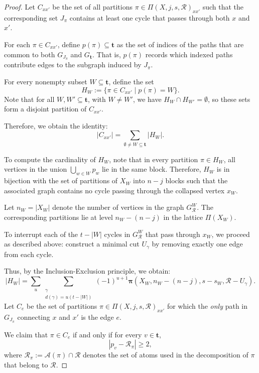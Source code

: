\documentclass[12pt]{extarticle}
\begin{document}
\begin{proof}
		Let \( C_{xx'} \) be the set of all partitions \( \pi \in \Pi(X, j, s, \mathcal{R})_{xx'} \) such that the corresponding set \( J_{\pi} \) contains at least one cycle that passes through both \( x \) and \( x' \).
		
		For each \( \pi \in C_{xx'} \), define \( p(\pi) \subseteq \mathbf{t} \) as the set of indices of the paths that are common to both \( G_{J_{\pi}} \) and \( G_{\mathbf{t}} \). That is, \( p(\pi) \) records which indexed paths contribute edges to the subgraph induced by \( J_{\pi} \).
		
		For every nonempty subset \( W \subseteq \mathbf{t} \), define the set
		\[
		H_W := \{ \pi \in C_{xx'} \mid p(\pi) = W \}.
		\]
		Note that for all \( W, W' \subseteq \mathbf{t} \), with \( W \neq W' \), we have \( H_W \cap H_{W'} = \emptyset \), so these sets form a disjoint partition of \( C_{xx'} \).
		
		Therefore, we obtain the identity:
		\[
		|C_{xx'}| = \sum_{\emptyset \neq W \subseteq \mathbf{t}} |H_W|.
		\]
		
		To compute the cardinality of \( H_W \), note that in every partition \( \pi \in H_W \), all vertices in the union \( \bigcup_{w \in W} p_w \) lie in the same block. Therefore, \( H_W \) is in bijection with the set of partitions of \( X_W \) into \( n - j \) blocks such that the associated graph contains no cycle passing through the collapsed vertex \( x_W \).
		
		Let \( n_W = |X_W| \) denote the number of vertices in the graph \( G_{\mathcal{R}}^W \). The corresponding partitions lie at level \( n_W - (n - j) \) in the lattice \( \Pi(X_W) \).
		
		To interrupt each of the \( t - |W| \) cycles in \( G_{\mathcal{R}}^W \) that pass through \( x_W \), we proceed as described above: construct a minimal cut \( U_{\gamma} \) by removing exactly one edge from each cycle.
		
		Thus, by the Inclusion-Exclusion principle, we obtain:
		\[
		|H_W| = \sum_u \sum_{\substack{\gamma \\ d(\gamma) = u(t - |W|)}} (-1)^{u+1} \bm{\pi}(X_W, n_W - (n - j), s - s_W, \mathcal{R} - U_{\gamma}).
		\]
		Let \( C_e \) be the set of partitions \( \pi \in \Pi(X, j, s, \mathcal{R})_{xx'} \) for which the \emph{only} path in \( G_{J_{\pi}} \) connecting \( x \) and \( x' \) is the edge \( e \).
		
		We claim that \( \pi \in C_e \) if and only if for every \( v \in \mathbf{t} \),
		\[
		|p_v - \mathcal{R}_{\pi}| \geq 2,
		\]
		where \( \mathcal{R}_{\pi} := \mathcal{A}(\pi) \cap \mathcal{R} \) denotes the set of atoms used in the decomposition of \( \pi \) that belong to \( \mathcal{R} \).
		

\end{proof}
\end{document}
